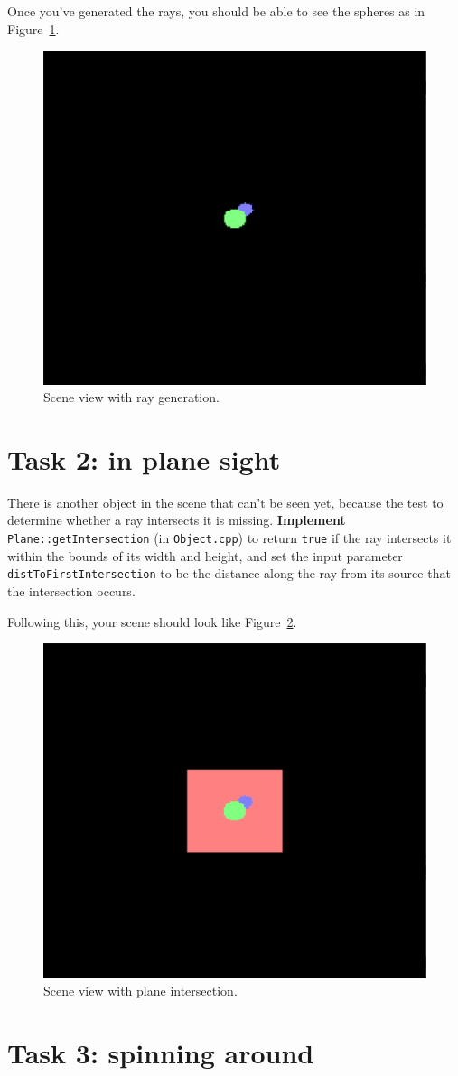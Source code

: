 \documentclass{../../../fal_assignment}
\begin{document}
Once you've generated the rays, you should be able to see the spheres as in Figure~\ref{fig:spheres}.

\begin{figure}[ht]
	\begin{center}
		\includegraphics[width=0.25\linewidth]{spheres}
	\end{center}
	\caption{Scene view with ray generation.}
	\label{fig:spheres}
\end{figure}

\section*{Task 2: in plane sight}

There is another object in the scene that can't be seen yet, because the test to determine whether a ray intersects it is missing. \textbf{Implement} \lstinline{Plane::getIntersection} (in \texttt{Object.cpp}) to return \lstinline{true} if the ray intersects it within the bounds of its width and height, and set the input parameter \lstinline{distToFirstIntersection} to be the distance along the ray from its source that the intersection occurs.

Following this, your scene should look like Figure~\ref{fig:plane}.

\begin{figure}[ht]
	\begin{center}
		\includegraphics[width=0.25\linewidth]{plane}
	\end{center}
	\caption{Scene view with plane intersection.}
	\label{fig:plane}
\end{figure}

\section*{Task 3: spinning around}
\end{document}
